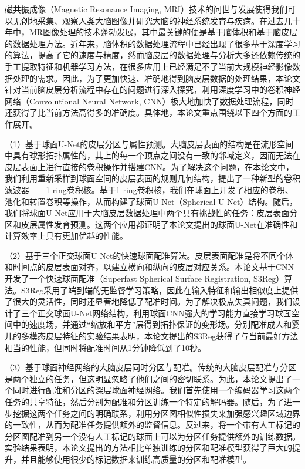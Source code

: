 \cleardoublepage
{}
磁共振成像（Magnetic Resonance Imaging, MRI）技术的问世与发展使得我们可以无创地采集、观察人类大脑图像并研究大脑的神经系统发育与疾病。在过去几十年中，MR图像处理的技术蓬勃发展，其中最关键的便是基于脑体积和基于脑皮层的数据处理方法。近年来，脑体积的数据处理流程中已经出现了很多基于深度学习的算法，提高了它的速度与精度，然而脑皮层的数据处理与分析大多还依赖传统的手工提取特征和机器学习方法，在很多应用上已经满足不了当前大规模神经影像数据处理的需求。因此，为了更加快速、准确地得到脑皮层数据的处理结果，本论文针对当前脑皮层分析流程中存在的问题进行深入探究，利用深度学习中的卷积神经网络（Convolutional Neural Network, CNN）极大地加快了数据处理流程，同时还获得了比当前方法高得多的准确度。具体地，本论文重点围绕以下四个方面的工作展开。

（1）基于球面U-Net的皮层分区与属性预测。大脑皮层表面的结构是在流形空间中具有球形拓扑属性的，其上的每一个顶点之间没有一致的邻域定义，因而无法在皮层表面上进行直接的卷积操作并搭建CNN。为了解决这个问题，在本论文中，我们利用重新采样到球面空间的皮层表面的规则几何结构，提出了一种新型的卷积滤波器——1-ring卷积核。基于1-ring卷积核，我们在球面上开发了相应的卷积、池化和转置卷积等操作，从而构建了球面U-Net（Spherical U-Net）结构。随后，我们将球面U-Net应用于大脑皮层数据处理中两个具有挑战性的任务：皮层表面分区和皮层属性发育预测。这两个应用都证明了本论文提出的球面U-Net在准确性和计算效率上具有更加优越的性能。

（2）基于三个正交球面U-Net的快速球面配准算法。皮层表面配准是将不同个体和时间点的皮层表面对齐，以建立横向和纵向的皮层对应关系。本论文基于CNN开发了一个快速球面配准（Superfast Spherical Surface Registration, S3Reg）算法。S3Reg采用了端到端的无监督学习策略，因此在输入特征和输出相似度上提供了很大的灵活性，同时还显著地降低了配准时间。为了解决极点失真问题，我们设计了三个正交球面U-Net网络结构，利用球面CNN强大的学习能力直接学习球面空间中的速度场，并通过“缩放和平方”层得到拓扑保证的变形场。分别配准成人和婴儿的多模态皮层特征的实验结果表明，本论文提出的S3Reg获得了与当前最好方法相当的性能，但同时将配准时间从1分钟降低到了10秒。	

（3）基于球面神经网络的大脑皮层同时分区与配准。传统的大脑皮层配准与分区是两个独立的任务，但这明显忽略了他们之间的密切联系。为此，本论文提出了一个同时进行配准和分区的深层球面神经网络。我们首先使用一个编码器学习这两个任务的共享特征，然后分别为配准和分区训练一个特定的解码器。随后，为了进一步挖掘这两个任务之间的明确联系，利用分区图相似性损失来加强感兴趣区域边界的一致性，从而为配准任务提供额外的监督信息。反过来，将一个带有人工标记的分区图配准到另一个没有人工标记的球面上可以为分区任务提供额外的训练数据。实验结果表明，本论文提出的方法相比单独训练的分区和配准模型获得了巨大的提升，并且能够使用很少的标记数据来训练高质量的分区和配准模型。


